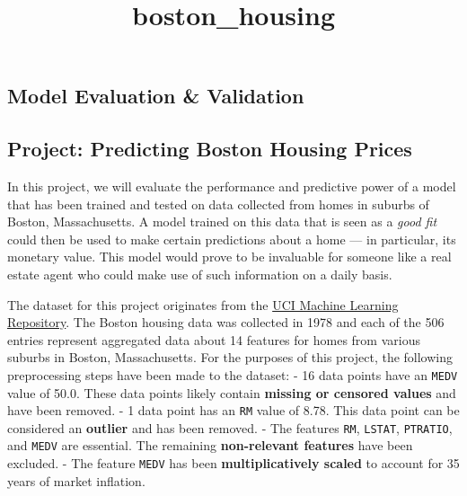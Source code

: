 \documentclass[11pt]{article}
\title{boston\_housing}
\begin{document}
    
    
    \maketitle
    
    

    
    \subsection{Model Evaluation \&
Validation}\label{model-evaluation-validation}

\subsection{Project: Predicting Boston Housing
Prices}\label{project-predicting-boston-housing-prices}

    In this project, we will evaluate the performance and predictive power
of a model that has been trained and tested on data collected from homes
in suburbs of Boston, Massachusetts. A model trained on this data that
is seen as a \emph{good fit} could then be used to make certain
predictions about a home --- in particular, its monetary value. This
model would prove to be invaluable for someone like a real estate agent
who could make use of such information on a daily basis.

The dataset for this project originates from the
\href{https://archive.ics.uci.edu/ml/datasets/Housing}{UCI Machine
Learning Repository}. The Boston housing data was collected in 1978 and
each of the 506 entries represent aggregated data about 14 features for
homes from various suburbs in Boston, Massachusetts. For the purposes of
this project, the following preprocessing steps have been made to the
dataset: - 16 data points have an
\texttt{\textquotesingle{}MEDV\textquotesingle{}} value of 50.0. These
data points likely contain \textbf{missing or censored values} and have
been removed. - 1 data point has an
\texttt{\textquotesingle{}RM\textquotesingle{}} value of 8.78. This data
point can be considered an \textbf{outlier} and has been removed. - The
features \texttt{\textquotesingle{}RM\textquotesingle{}},
\texttt{\textquotesingle{}LSTAT\textquotesingle{}},
\texttt{\textquotesingle{}PTRATIO\textquotesingle{}}, and
\texttt{\textquotesingle{}MEDV\textquotesingle{}} are essential. The
remaining \textbf{non-relevant features} have been excluded. - The
feature \texttt{\textquotesingle{}MEDV\textquotesingle{}} has been
\textbf{multiplicatively scaled} to account for 35 years of market
inflation.
\end{document}
